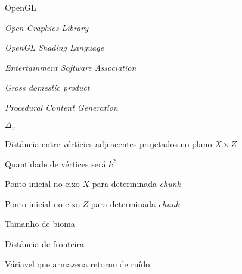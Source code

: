 \documentclass[tg]{mdtuffs}
\begin{document}
\begin{listofabbrv}{OpenGL}
    \item [OpenGL] \textit{Open Graphics Library}
    \item [GLSL] \textit{OpenGL Shading Language}
    \item [ESA] \textit{Entertainment Software Association}
    \item [GDP] \textit{Gross domestic product}
    \item [PCG] \textit{Procedural Content Generation}
    
\end{listofabbrv}


\begin{listofsymbols}{$\Delta_{v}$}
    \item [$\Delta_{v}$] Distância entre vérticies adjeacentes projetados no plano $X \times Z$
    \item [$k$] Quantidade de vértices será $k^2$
    \item [$x_{s}$] Ponto inicial no eixo $X$ para determinada \textit{chunk}
    \item [$z_{s}$] Ponto inicial no eixo $Z$ para determinada \textit{chunk}
    \item [$b$] Tamanho de bioma
    \item [$l$] Distância de fronteira
    \item [$h'$] Váriavel que armazena retorno de ruído
    
\end{listofsymbols}

\tableofcontents


\setlength{\baselineskip}{1.5\baselineskip}
\end{document}
